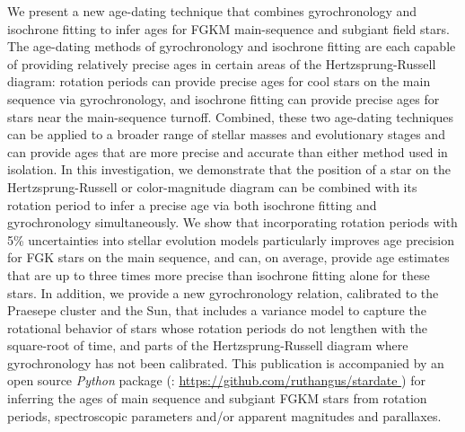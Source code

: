 We present a new age-dating technique that combines gyrochronology and
isochrone fitting to infer ages for FGKM main-sequence and subgiant field
stars.
The age-dating methods of gyrochronology and isochrone fitting are each
capable of providing relatively precise ages in certain areas of the
Hertzsprung-Russell diagram: rotation periods can provide precise ages for
cool stars on the main sequence via gyrochronology, and isochrone fitting
can provide precise ages for stars near the main-sequence turnoff.
Combined, these two age-dating techniques can be applied to a broader range of
stellar masses and evolutionary stages and can provide ages that are more
precise and accurate than either method used in isolation.
In this investigation, we demonstrate that the position of a star on the
Hertzsprung-Russell or color-magnitude diagram can be combined with its
rotation period to infer a precise age via both isochrone fitting and
gyrochronology simultaneously.
We show that incorporating rotation periods with 5\% uncertainties into
stellar evolution models particularly improves age precision for FGK stars on
the main sequence, and can, on average, provide age estimates that are up to
three times more precise than isochrone fitting alone for these stars.
In addition, we provide a new gyrochronology relation, calibrated to the
Praesepe cluster and the Sun, that includes a variance model to capture the
rotational behavior of stars whose rotation periods do not lengthen with the
square-root of time, and parts of the Hertzsprung-Russell diagram where
gyrochronology has not been calibrated.
This publication is accompanied by an open source {\it Python} package (\sd:
\url{ https://github.com/ruthangus/stardate }) for inferring the ages of main
sequence and subgiant FGKM stars from rotation periods, spectroscopic
parameters and/or apparent magnitudes and parallaxes.
